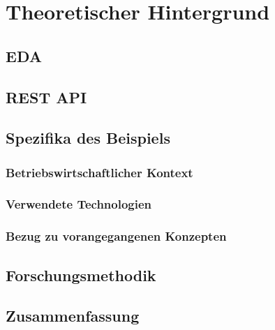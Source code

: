 \section{Theoretischer Hintergrund}
\subsection{\ac{EDA}}
\label{Abschnitt:Arbeitsumfeld}
\subsection{\ac{REST} \ac{API}}
\subsection{Spezifika des Beispiels}
\subsubsection{Betriebswirtschaftlicher Kontext}
\subsubsection{Verwendete Technologien}
\subsubsection{Bezug zu vorangegangenen Konzepten}
\subsection{Forschungsmethodik}
\subsection{Zusammenfassung}



 
